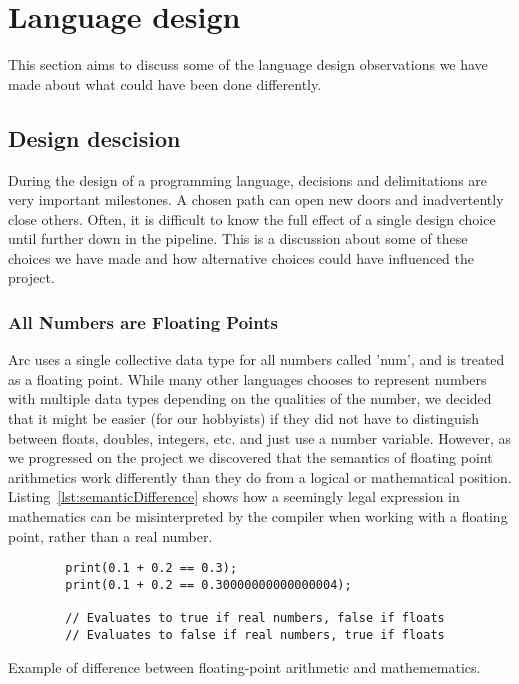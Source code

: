 \section{Language design}\label{sec:discussion_languageDesign}

This section aims to discuss some of the language design observations we have made about what could have been done differently.

\subsection{Design descision}

During the design of a programming language, decisions and delimitations are very important milestones. A chosen path can open new doors and inadvertently close others. Often, it is difficult to know the full effect of a single design choice until further down in the pipeline. This is a discussion about some of these choices we have made and how alternative choices could have influenced the project.

\subsubsection{All Numbers are Floating Points}

Arc uses a single collective data type for all numbers called 'num', and is treated as a floating point. While many other languages chooses to represent numbers with multiple data types depending on the qualities of the number, we decided that it might be easier (for our hobbyists) if they did not have to distinguish between floats, doubles, integers, etc. and just use a number variable. However, as we progressed on the project we discovered that the semantics of floating point arithmetics work differently than they do from a logical or mathematical position. Listing~\ref{lst:semanticDifference} shows how a seemingly legal expression in mathematics can be misinterpreted by the compiler when working with a floating point, rather than a real number.

\begin{listing}[htb!]
    \begin{verbatim}
        print(0.1 + 0.2 == 0.3);
        print(0.1 + 0.2 == 0.30000000000000004);

        // Evaluates to true if real numbers, false if floats
        // Evaluates to false if real numbers, true if floats
    \end{verbatim}
    \caption{Example of difference between floating-point arithmetic and mathemematics.}
    \label{lst:semanticDifference}
\end{listing}

